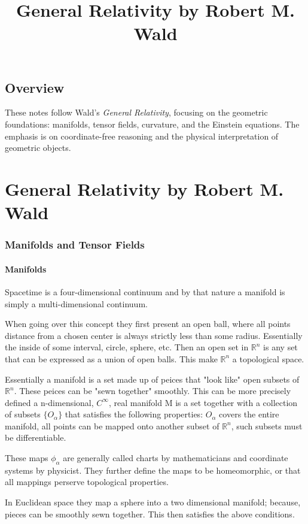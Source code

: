 \title{General Relativity by Robert M. Wald}

\section{Overview}
These notes follow Wald's \emph{General Relativity}, focusing on the geometric foundations: manifolds, tensor fields, curvature, and the Einstein equations. The emphasis is on coordinate-free reasoning and the physical interpretation of geometric objects.

\chapter{General Relativity by Robert M. Wald}

\subsection{Manifolds and Tensor Fields}
\subsubsection{Manifolds}
Spacetime is a four-dimensional continuum and by that nature a manifold is simply a multi-dimensional continuum.

When going over this concept they first present an open ball, where  all points distance from a chosen center is always strictly less than some radius. Essentially the inside of some interval, circle, sphere, etc. Then an open set in $\mathbb{R}^n$ is any set that can be expressed as a union of open balls. This make $\mathbb{R}^n$ a topological space.

Essentially a manifold is a set made up of peices that "look like" open subsets of $\mathbb{R}^n$. These peices can be "sewn together" smoothly. This can be more precisely defined a n-dimensional, $C^{\infty}$, real manifold M is a set together with a collection of subsets $\{ O_\alpha \}$ that satisfies the following properties: $O_\alpha$ covers the entire manifold, all points can be mapped onto another subset of $\mathbb{R}^n$, such subsets must be differentiable.

These maps $\phi_\alpha$ are generally called charts by mathematicians and coordinate systems by physicist. They further define the maps to be homeomorphic, or that all mappings perserve topological properties.

In Euclidean space they map a sphere into a two dimensional manifold; because, pieces can be smoothly sewn together. This then satisfies the above conditions.

